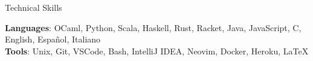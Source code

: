 
\begin{rSection}{Technical Skills}

	\textbf{Languages}: OCaml, Python, Scala, Haskell, Rust, Racket, Java, JavaScript, C, English, Espa{\~n}ol, Italiano
	\\
	\textbf{Tools}: Unix, Git, VSCode, Bash, IntelliJ IDEA, Neovim, Docker, Heroku, \LaTeX
\end{rSection}